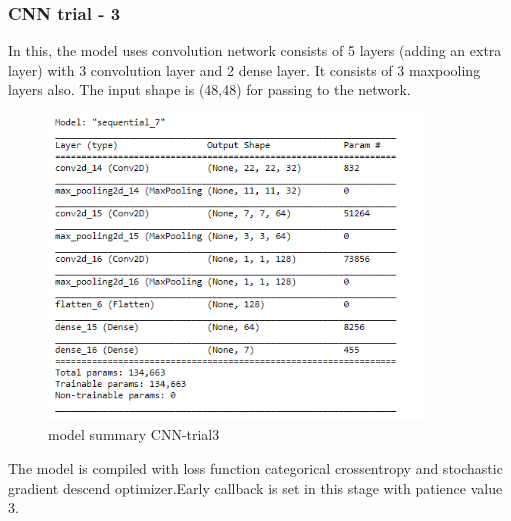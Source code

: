 \subsubsection{CNN trial - 3}
 In this, the model uses convolution network consists of 5 layers (adding an extra layer) with 3 convolution layer and 2 dense layer. It consists of 3 maxpooling layers also. The input shape is (48,48) for passing to the network.
\begin{figure}[h]
\label{ss}
\centering
\includegraphics[width= 10cm]{cnn_trial3sum.PNG}
\caption{model summary CNN-trial3}
\end{figure} 
The model is compiled with loss function categorical crossentropy and stochastic gradient descend optimizer.Early callback is set in this stage with patience value 3.



